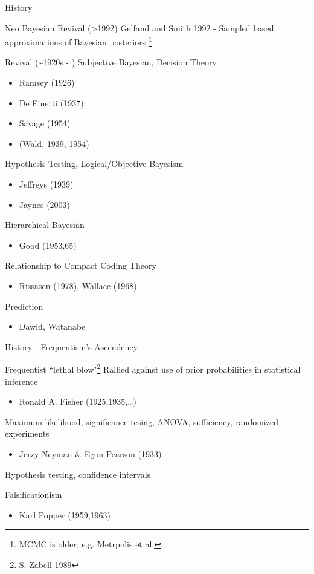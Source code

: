 \documentclass[presentation,9pt,xcolor=dvipsnames]{beamer}
\begin{document}
\begin{frame}[label={sec:orgc90e9e1}]{History}
\begin{block}{Neo Bayesian Revival (>1992)}
Gelfand and Smith 1992 - Sampled based approximations of Bayesian posteriors \footnote{MCMC is older, e.g. Metrpolis et al. }
\end{block}
\begin{block}{Revival (\textasciitilde{}1920s - )}
Subjective Bayesian, Decision Theory
\begin{itemize}
\item Ramsey (1926)
\item De Finetti (1937)
\item Savage (1954)
\item (Wald, 1939, 1954)
\end{itemize}
Hypothesis Testing, Logical/Objective Bayesism
\begin{itemize}
\item Jeffreys (1939)
\item Jaynes (2003)
\end{itemize}
Hierarchical Bayesian
\begin{itemize}
\item Good (1953,65)
\end{itemize}
Relationship to Compact Coding Theory
\begin{itemize}
\item Rissasen (1978), Wallace (1968)
\end{itemize}
Prediction
\begin{itemize}
\item Dawid, Watanabe
\end{itemize}
\end{block}
\end{frame}
\begin{frame}[label={sec:org2828cc3}]{History - Frequentism's Ascendency}
\begin{block}{Frequentist ``lethal blow"\footnote{S. Zabell 1989}}
Rallied against use of prior probabilities in statistical inference
\begin{itemize}
\item Ronald A. Fisher (1925,1935,\ldots{})
\end{itemize}
Maximum likelihood, significance tesing, ANOVA, sufficiency, randomized experiments
\begin{itemize}
\item Jerzy Neyman \& Egon Pearson (1933)
\end{itemize}
Hypothesis testing, confidence intervals
\end{block}
\begin{block}{Falsificationism}
\begin{itemize}
\item Karl Popper (1959,1963)
\end{itemize}
\end{block}
\end{frame}
\end{document}
